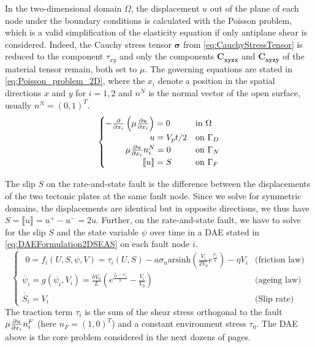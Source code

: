 In the two-dimensional domain $\Omega$, the displacement $u$ out of the plane of each node under the boundary conditions is calculated with the Poisson problem, which is a valid simplification of the elasticity equation if only antiplane shear is considered. Indeed, the Cauchy stress tensor $\mathbf{\sigma}$ from \autoref{eq:CauchyStressTensor} is reduced to the component $\tau_{xy}$ and only the components $\mathbf{C_{xyzx}}$ and $\mathbf{C_{xyzy}}$ of the material tensor remain, both set to $\mu$. The governing equations are stated in \autoref{eq:Poisson_problem_2D}, where the $x_i$ denote a position in the spatial directions $x$ and $y$ for $i=1,2$ and $n^N$ is the normal vector of the open surface, usually  $n^N=(0,1)^T$.
\begin{equation}
	\label{eq:Poisson_problem_2D}
	\begin{cases}
		-\pdv{}{x_i}\left(\mu\pdv{u}{x_i}\right) = 0 & \text{in } \Omega \\
		\qquad\qquad\quad\,  u = V_pt/2 & \text{on } \Gamma_D \\
		\qquad\ \mu\pdv{u}{x_i}n^N_i = 0 & \text{on } \Gamma_N \\
		\qquad\qquad\  \llbracket u \rrbracket = S  & \text{on } \Gamma_F
	\end{cases}		
\end{equation}

The slip $S$ on the rate-and-state fault is the difference between the displacements of the two tectonic plates at the same fault node. Since we solve for symmetric domains, the displacements are identical but in opposite directions, we thus have $S = \llbracket u \rrbracket = u^+ - u^- = 2u$. Further, on the rate-and-state fault, we have to solve for the slip $S$ and the state variable $\psi$ over time in a DAE stated in \autoref{eq:DAEFormulation2DSEAS} on each fault node $i$. 
\begin{equation}
	\label{eq:DAEFormulation2DSEAS}
	\begin{cases}
		\,\  0 = f_i(U,S,\psi,V) = \tau_i(U,S) - a\sigma_n\text{arsinh}\left(\frac{V_i}{2V_0}e^{\frac{\psi_i}{a}}\right) -\eta V_i & \text{(friction law)}\\
		\dot{\psi_i} = g(\psi_i, V_i) =\frac{bV_0}{L}\left(e^{\frac{f_0-\psi_i}{b}} - \frac{V_i}{V_0}\right) & \text{(ageing law)} \\
    	\dot{S_i} = V_i & \text{(Slip rate)}
	\end{cases}
\end{equation} 
The traction term $\tau_i$  is the sum of the shear stress orthogonal to the fault $\mu\pdv{u}{x_i}n^F_i$ (here $n_F = (1,0)^T$) and a constant environment stress $\tau_0$. The DAE above is the core problem considered in the next dozens of pages. 


